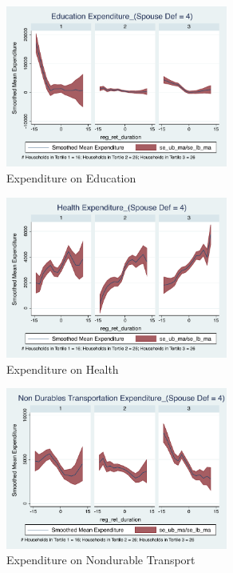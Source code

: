 \documentclass[11pt,onecolumn]{article}
\numberwithin{figure}{section}
\begin{document}
\begin{figure}[h]
	\caption{Expenditure on Education}
	\centering
	\includegraphics[width=0.65\textwidth]{../ConsumptionPostRetirement_by_SpouseDef_Cats/Smoothed/4/spouse_def_total_education_real.pdf}
\end{figure}
\clearpage

\begin{figure}[h]
	\caption{Expenditure on Health}
	\centering
	\includegraphics[width=0.65\textwidth]{../ConsumptionPostRetirement_by_SpouseDef_Cats/Smoothed/4/spouse_def_total_healthexpense_real.pdf}
\end{figure}


\begin{figure}[h]
	\caption{Expenditure on Nondurable Transport}
	\centering
	\includegraphics[width=0.65\textwidth]{../ConsumptionPostRetirement_by_SpouseDef_Cats/Smoothed/4/spouse_def_total_transport_real.pdf}
\end{figure}
\clearpage
\end{document}
